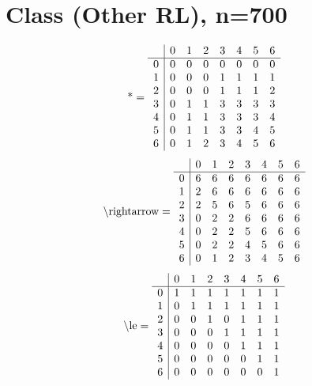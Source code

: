 \documentclass[11pt]{article}
\begin{document}
\section{Class (Other RL), n=700}
\[\text{*} = 
\begin{array}{r | r r r r r r r}
 & 0 & 1 & 2 & 3 & 4 & 5 & 6 \\ \hline
0 & 0 & 0 & 0 & 0 & 0 & 0 & 0 \\
1 & 0 & 0 & 0 & 1 & 1 & 1 & 1 \\
2 & 0 & 0 & 0 & 1 & 1 & 1 & 2 \\
3 & 0 & 1 & 1 & 3 & 3 & 3 & 3 \\
4 & 0 & 1 & 1 & 3 & 3 & 3 & 4 \\
5 & 0 & 1 & 1 & 3 & 3 & 4 & 5 \\
6 & 0 & 1 & 2 & 3 & 4 & 5 & 6 \\
\end{array}
\]
\[\text{\textbackslash rightarrow} = 
\begin{array}{r | r r r r r r r}
 & 0 & 1 & 2 & 3 & 4 & 5 & 6 \\ \hline
0 & 6 & 6 & 6 & 6 & 6 & 6 & 6 \\
1 & 2 & 6 & 6 & 6 & 6 & 6 & 6 \\
2 & 2 & 5 & 6 & 5 & 6 & 6 & 6 \\
3 & 0 & 2 & 2 & 6 & 6 & 6 & 6 \\
4 & 0 & 2 & 2 & 5 & 6 & 6 & 6 \\
5 & 0 & 2 & 2 & 4 & 5 & 6 & 6 \\
6 & 0 & 1 & 2 & 3 & 4 & 5 & 6 \\
\end{array}
\]
\[\text{\textbackslash le} = 
\begin{array}{r | r r r r r r r}
 & 0 & 1 & 2 & 3 & 4 & 5 & 6 \\ \hline
0 & 1 & 1 & 1 & 1 & 1 & 1 & 1 \\
1 & 0 & 1 & 1 & 1 & 1 & 1 & 1 \\
2 & 0 & 0 & 1 & 0 & 1 & 1 & 1 \\
3 & 0 & 0 & 0 & 1 & 1 & 1 & 1 \\
4 & 0 & 0 & 0 & 0 & 1 & 1 & 1 \\
5 & 0 & 0 & 0 & 0 & 0 & 1 & 1 \\
6 & 0 & 0 & 0 & 0 & 0 & 0 & 1 \\
\end{array}
\]
\end{document}
